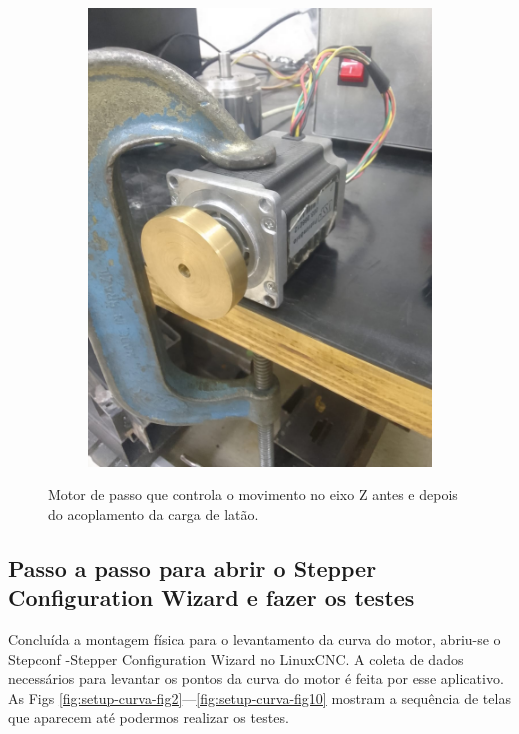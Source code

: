 \begin{figure}[H]
\begin{subfigure}{0.35\textwidth}
        \includegraphics[width=\textwidth]{images/Eletrica/Figura1b.png}
    \end{subfigure}
    \caption{Motor de passo que controla o movimento no eixo Z antes e depois do acoplamento da carga de latão.}
    \label{fig:montagem-teste}
\end{figure}

\subsection{Passo a passo para abrir o Stepper Configuration Wizard e fazer os testes}

Concluída a montagem física para o levantamento da curva do motor, abriu-se o Stepconf -Stepper Configuration Wizard no LinuxCNC. A coleta de dados necessários para levantar os pontos da curva do motor é feita por esse aplicativo. As Figs \ref{fig:setup-curva-fig2}---\ref{fig:setup-curva-fig10} mostram a sequência de telas que aparecem até podermos realizar os testes.


